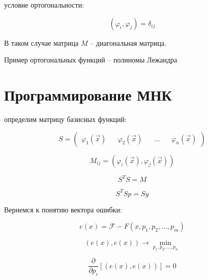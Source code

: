 \documentclass[10pt,a4paper]{article}
\begin{document}
 	условие ортогональности:
 	
 	\begin{equation}
 		\left(\varphi_{i}, \varphi_{j}\right) = \delta_{ij}
 	\end{equation}
 	
 	В таком случае матрица $M$ -- диагональная матрица.
 	
 	Пример ортогональных функций -- полиномы Лежандра
 	
 	\section{Программирование МНК}
 	
 	определим матрицу базисных функций:
 	
 	\begin{equation}
 		S = \begin{pmatrix}
 			\varphi_{1}\left(\vec{x}\right) &&
 			\varphi_{2}\left(\vec{x}\right) &&
 			\ldots &&
 			\varphi_{n}\left(\vec{x}\right)
 		\end{pmatrix}
 	\end{equation}
 	
 	\begin{equation}
 		M_{ij} = \left(\varphi_{i}\left(\vec{x}\right), 
 		\varphi_{j}\left(\vec{x}\right)\right)
 	\end{equation}
 	
 	\begin{equation}
 		S^{T}S = M
 	\end{equation}
 	
 	\begin{equation}
 		S^{T}Sp = Sy
 	\end{equation}

	Вернемся к понятию вектора ошибки:
 	
 	\begin{equation}
 		e\left(x\right) = \mathcal{F} - F\left(x, p_{1}, p_{2}, \ldots, p_{m}
 		\right)
 	\end{equation}
 	
 	\begin{equation}
 		\left(e\left(x\right), e\left(x\right)\right)\rightarrow\min\limits_{
 		p_{1}, p_{2}, \ldots, p_{n}}
 	\end{equation}
 	
 	\begin{equation}
 		\frac{\partial}{\partial p_{i}}\left[\left(e\left(x\right), 
 		e\left(x\right)\right)\right] = 0
 	\end{equation}
 	
\end{document}
